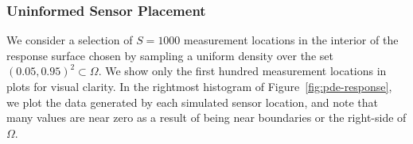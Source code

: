 \FloatBarrier
\subsubsection{Uninformed Sensor Placement}

We consider a selection of $S=1000$ measurement locations in the interior of the response surface chosen by sampling a uniform density over the set $(0.05, 0.95)^2 \subset \Omega$.
We show only the first hundred measurement locations in plots for visual clarity.
In the rightmost histogram of Figure~\ref{fig:pde-response}, we plot the data generated by each simulated sensor location, and note that many values are near zero as a result of being near boundaries or the right-side of $\Omega$.

